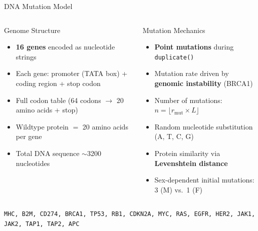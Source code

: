 \documentclass[aspectratio=169,10pt]{beamer}
\begin{document}
\begin{frame}{DNA Mutation Model}
  \begin{columns}[T]
    \begin{block}{Genome Structure}
      \begin{itemize}
        \item \textbf{16 genes} encoded as nucleotide strings
        \item Each gene: promoter (TATA box) + coding region + stop codon
        \item Full codon table (64 codons $\to$ 20 amino acids + stop)
        \item Wildtype protein $=$ 20 amino acids per gene
        \item Total DNA sequence $\sim$3200 nucleotides
      \end{itemize}
    \end{block}

    \begin{block}{Mutation Mechanics}
      \begin{itemize}
        \item \textbf{Point mutations} during \texttt{duplicate()}
        \item Mutation rate driven by \textbf{genomic instability} (BRCA1)
        \item Number of mutations: $n = \lfloor r_\text{mut} \times L \rfloor$
        \item Random nucleotide substitution (A, T, C, G)
        \item Protein similarity via \textbf{Levenshtein distance}
        \item Sex-dependent initial mutations: 3 (M) vs.\ 1 (F)
      \end{itemize}
    \end{block}
  \end{columns}

  \vspace{0.5em}
  \centering
  \small
  \texttt{MHC, B2M, CD274, BRCA1, TP53, RB1, CDKN2A, MYC, RAS, EGFR, HER2, JAK1, JAK2, TAP1, TAP2, APC}
\end{frame}
\end{document}
